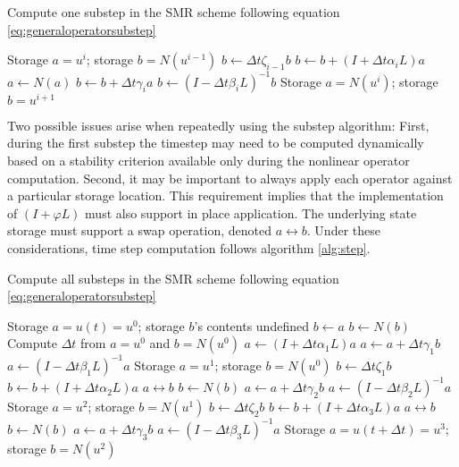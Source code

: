 \documentclass[letterpaper,reqno,11pt]{amsart}
\begin{document}
\begin{algorithm}
\caption{Compute one substep in the SMR scheme following
         equation \eqref{eq:generaloperatorsubstep}}
\label{alg:substep}
\begin{algorithmic}
  \REQUIRE Storage $a = u^i$;
           storage $b = N\left(u^{i-1}\right)$
  \STATE $b\leftarrow{}\Delta{}t\zeta_{i-1}b$
  \STATE $b\leftarrow{}b + \left(I+\Delta{}t\alpha_{i}L\right)a$
  \STATE $a\leftarrow{}N\left(a\right)$
  \STATE $b\leftarrow{}b + \Delta{}t\gamma_{i}a$
  \STATE $b\leftarrow{}\left(I-\Delta{}t\beta_{i}L\right)^{-1}b$
  \ENSURE Storage $a = N\left(u^{i}\right)$;
          storage $b = u^{i+1}$
\end{algorithmic}
\end{algorithm}

Two possible issues arise when repeatedly using the substep algorithm: First,
during the first substep the timestep may need to be computed dynamically based
on a stability criterion available only during the nonlinear operator
computation.  Second, it may be important to always apply each operator against
a particular storage location.  This requirement implies that the
implementation of $\left(I+\varphi{}L\right)$ must also support in place
application.  The underlying state storage must support a swap operation,
denoted $a\leftrightarrow{}b$.  Under these considerations, time step
computation follows algorithm \vref{alg:step}.

\begin{algorithm}
\caption{Compute all substeps in the SMR scheme following
         equation \eqref{eq:generaloperatorsubstep}}
\label{alg:step}
\begin{algorithmic}
  \renewcommand{\algorithmiccomment}[1]{\hfill{}// #1}
  \REQUIRE Storage $a = u\left(t\right) = u^{0} $;
           storage $b$'s contents undefined
  \STATE $b\leftarrow{}a$
  \STATE $b\leftarrow{}N\left(b\right)$
  \STATE Compute $\Delta{}t$ from $a=u^0$ and $b=N\left(u^0\right)$
  \STATE $a\leftarrow{}\left(I+\Delta{}t\alpha_{1}L\right)a$
  \STATE $a\leftarrow{}a + \Delta{}t \gamma_{1} b$
  \STATE $a\leftarrow{}\left(I-\Delta{}t\beta_{1}L\right)^{-1}a$
  \ENSURE Storage $a = u^1$;
          storage $b = N\left(u^{0}\right)$
  \STATE $b\leftarrow{}\Delta{}t\zeta_{1}b$
  \STATE $b\leftarrow{}b+\left(I+\Delta{}t\alpha_{2}L\right)a$
  \STATE $a\leftrightarrow{}b$
  \STATE $b\leftarrow{}N\left(b\right)$
  \STATE $a\leftarrow{}a + \Delta{}t \gamma_{2} b$
  \STATE $a\leftarrow{}\left(I-\Delta{}t\beta_{2}L\right)^{-1}a$
  \ENSURE Storage $a = u^{2}$;
          storage $b = N\left(u^{1}\right)$
  \STATE $b\leftarrow{}\Delta{}t\zeta_{2}b$
  \STATE $b\leftarrow{}b+\left(I+\Delta{}t\alpha_{3}L\right)a$
  \STATE $a\leftrightarrow{}b$
  \STATE $b\leftarrow{}N\left(b\right)$
  \STATE $a\leftarrow{}a + \Delta{}t \gamma_{3} b$
  \STATE $a\leftarrow{}\left(I-\Delta{}t\beta_{3}L\right)^{-1}a$
  \ENSURE Storage $a = u\left(t+\Delta{}t\right)= u^{3}$;
          storage $b = N\left(u^{2}\right)$
\end{algorithmic}
\end{algorithm}
\end{document}
